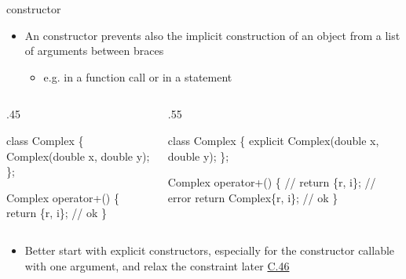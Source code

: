 \begin{frame}[fragile]{ constructor \insertcontinuationtext}

  \begin{itemize}
  \item An  constructor prevents also the implicit construction
    of an object from a list of arguments between braces
    \begin{itemize}
    \item e.g. in a function call or in a  statement
    \end{itemize}
  \end{itemize}

  \begin{columns}[t]
    \begin{column}{.45\textwidth}
      \begin{codeblock}
class Complex \{
  \ddd
  Complex(double x, double y);
\};

Complex operator+(\ddd)
\{
  \ddd
  return \{r, i\}; // ok
\}\end{codeblock}

    \end{column}

    \begin{column}{.55\textwidth}
      \begin{codeblock}
class Complex \{
  \ddd
  \alert{explicit} Complex(double x, double y);
\};

Complex operator+(\ddd)
\{
  \ddd
  // return \{r, i\}; // error
  return Complex\{r, i\}; // ok
\}\end{codeblock}

    \end{column}

  \end{columns}

  \begin{itemize}
  \item<2> Better start with explicit constructors, especially for the
    constructor callable with one argument, and relax the constraint later
    \href{https://isocpp.github.io/CppCoreGuidelines/CppCoreGuidelines#c46-by-default-declare-single-argument-constructors-explicit}{C.46}
  \end{itemize}

\end{frame}

